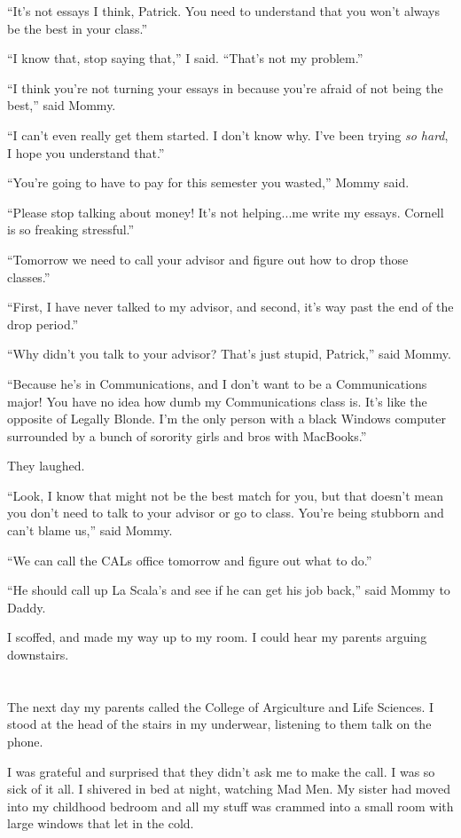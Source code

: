 ``It's not essays I think, Patrick.  You need to understand that you won't always be the
best in your class.''

``I know that, stop saying that,'' I said.  ``That's not my problem.''

``I think you're not turning your essays in because you're afraid of not being
the best,'' said Mommy.

``I can't even really get them started.  I don't know why.  I've been trying
\textit{so hard}, I hope you understand that.''

``You're going to have to pay for this semester you wasted,'' Mommy said.

``Please stop talking about money!  It's not helping...me write my essays.
Cornell is so freaking stressful.''

``Tomorrow we need to call your advisor and figure out how to drop those
classes.''

``First, I have never talked to my advisor, and second, it's way past the end of
the drop period.''

``Why didn't you talk to your advisor?  That's just stupid, Patrick,'' said Mommy.

``Because he's in Communications, and I don't want to be a Communications major!
You have no idea how dumb my Communications class is.  It's like the opposite of
Legally Blonde.  I'm the only person with a black Windows computer surrounded by
a bunch of sorority girls and bros with MacBooks.''

They laughed.

``Look, I know that might not be the best match for you, but that doesn't mean
you don't need to talk to your advisor or go to class.  You're being stubborn
and can't blame us,'' said Mommy.

``We can call the CALs office tomorrow and figure out what to do.''

``He should call up La Scala's and see if he can get his job back,'' said Mommy to
Daddy.

I scoffed, and made my way up to my room.  I could hear my parents arguing
downstairs.

\section{}

The next day my parents called the College of Argiculture and Life Sciences.  I
stood at the head of the stairs in my underwear, listening to them talk on the
phone.  

I was grateful and surprised that they didn't ask me to make the call.  I was so
sick of it all.  I shivered in bed at night, watching Mad Men.  My sister had
moved into my childhood bedroom and all my stuff was crammed into a small
room with large windows that let in the cold.  
